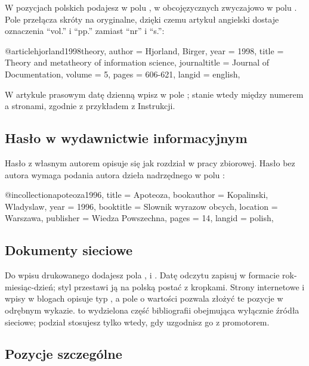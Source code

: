 W pozycjach polskich podajesz  w polu , w obcojęzycznych zwyczajowo  w polu . Pole  przełącza skróty na oryginalne, dzięki czemu artykuł angielski dostaje oznaczenia \enquote{vol.} i \enquote{pp.} zamiast \enquote{nr} i \enquote{s.}:

\begin{zapis}
@article{hjorland1998theory,
  author       = {Hjorland, Birger},
  year         = {1998},
  title        = {Theory and metatheory of information science},
  journaltitle = {Journal of Documentation},
  volume       = {5},
  pages        = {606-621},
  langid       = {english},
}
\end{zapis}

W artykule prasowym datę dzienną wpisz w pole ; stanie wtedy między numerem a stronami, zgodnie z przykładem z Instrukcji.

\subsection{Hasło w wydawnictwie informacyjnym}

Hasło z własnym autorem opisuje się jak rozdział w pracy zbiorowej. Hasło bez autora wymaga podania autora dzieła nadrzędnego w polu :

\begin{zapis}
@incollection{apoteoza1996,
  title      = {Apoteoza},
  bookauthor = {Kopalinski, Wladyslaw},
  year       = {1996},
  booktitle  = {Slownik wyrazow obcych},
  location   = {Warszawa},
  publisher  = {Wiedza Powszechna},
  pages      = {14},
  langid     = {polish},
}
\end{zapis}

\subsection{Dokumenty sieciowe}

Do wpisu drukowanego dodajesz pola ,  i . Datę odczytu zapisuj w formacie rok-miesiąc-dzień; styl przestawi ją na polską postać z kropkami. Strony internetowe i wpisy w blogach opisuje typ , a pole  o wartości  pozwala złożyć te pozycje w odrębnym wykazie.  to wydzielona część bibliografii obejmująca wyłącznie źródła sieciowe; podział stosujesz tylko wtedy, gdy uzgodnisz go z promotorem.

\subsection{Pozycje szczególne}

